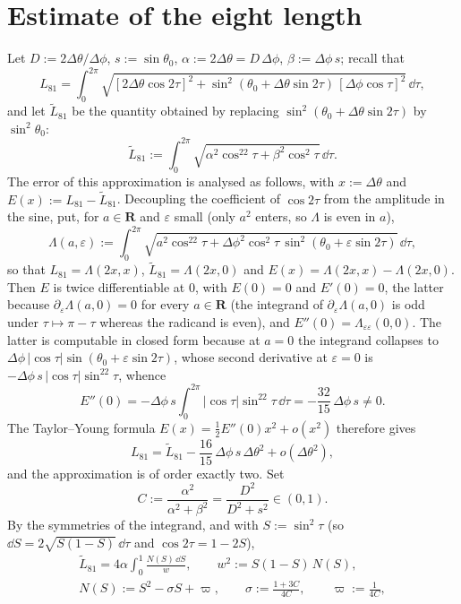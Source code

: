 \section{Estimate of the eight length} \label{app8}
Let $D:=2\Delta\theta/\Delta\phi$, $s:=\sin\theta_0$, $\alpha:=2\Delta\theta=D\,\Delta\phi$, $\beta:=\Delta\phi\,s$; recall that %
$$L_{81}=\int_0^{2\pi}\sqrt{[2\Delta\theta\cos2\tau]^2+\sin^2(\theta_0+\Delta\theta\sin2\tau)\,[\Delta\phi\cos\tau]^2}\,\dd\tau,$$
and let $\widetilde L_{81}$ be the quantity obtained by replacing $\sin^2(\theta_0+\Delta\theta\sin2\tau)$ by $\sin^2\theta_0$:
$$\widetilde L_{81}:=\int_0^{2\pi}\sqrt{\alpha^2\cos^22\tau+\beta^2\cos^2\tau}\,\dd\tau .$$
The error of this approximation is analysed as follows, with $x:=\Delta\theta$ and $E(x):=L_{81}-\widetilde L_{81}$. Decoupling the coefficient of $\cos2\tau$ from the amplitude in the sine, put, for $a\in\mathbf{R}$ and $\varepsilon$ small (only $a^2$ enters, so $\Lambda$ is even in $a$),
$$\Lambda(a,\varepsilon):=\int_0^{2\pi}\sqrt{a^2\cos^22\tau+\Delta\phi^2\cos^2\tau\,\sin^2(\theta_0+\varepsilon\sin2\tau)}\,\dd\tau,$$
so that $L_{81}=\Lambda(2x,x)$, $\widetilde L_{81}=\Lambda(2x,0)$ and $E(x)=\Lambda(2x,x)-\Lambda(2x,0)$. Then $E$ is twice differentiable at $0$, with $E(0)=0$ and $E'(0)=0$, the latter because $\partial_\varepsilon\Lambda(a,0)=0$ for every $a\in\mathbf{R}$ (the integrand of $\partial_\varepsilon\Lambda(a,0)$ is odd under $\tau\mapsto\pi-\tau$ whereas the radicand is even), and $E''(0)=\Lambda_{\varepsilon\varepsilon}(0,0)$. The latter is computable in closed form because at $a=0$ the integrand collapses to $\Delta\phi\,|\cos\tau|\sin(\theta_0+\varepsilon\sin2\tau)$, whose second derivative at $\varepsilon=0$ is $-\Delta\phi\,s\,|\cos\tau|\sin^22\tau$, whence
$$E''(0)=-\Delta\phi\,s\int_0^{2\pi}|\cos\tau|\sin^22\tau\,\dd\tau=-\frac{32}{15}\,\Delta\phi\,s\ne0 .$$
The Taylor--Young formula $E(x)=\tfrac12E''(0)x^2+o(x^2)$ therefore gives
$$L_{81}=\widetilde L_{81}-\frac{16}{15}\,\Delta\phi\,s\,\Delta\theta^2+o(\Delta\theta^2),$$
and the approximation is of order exactly two. Set
$$C:=\frac{\alpha^2}{\alpha^2+\beta^2}=\frac{D^2}{D^2+s^2}\in(0,1).$$
By the symmetries of the integrand, and with $S:=\sin^2\tau$ (so $\dd S=2\sqrt{S(1-S)}\,\dd\tau$ and $\cos2\tau=1-2S$),
$$\begin{gathered}\widetilde L_{81}=4\alpha\int_0^1\frac{N(S)\,\dd S}{w},\qquad w^2:=S(1-S)\,N(S),\\ N(S):=S^2-\sigma S+\varpi,\qquad \sigma:=\frac{1+3C}{4C},\qquad \varpi:=\frac1{4C},\end{gathered}$$

